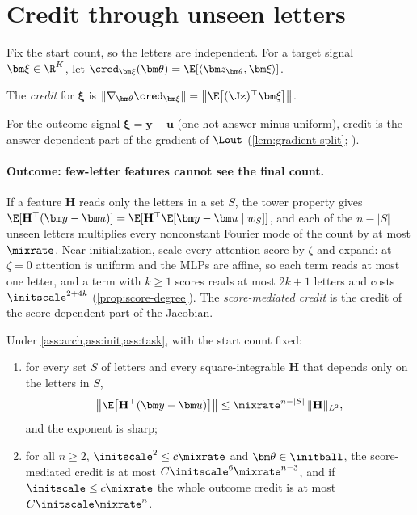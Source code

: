 \section{Credit through unseen letters}
\label{sec:credit}

Fix the start count, so the letters are independent. For a target signal $\bm\xi\in\R^K$, let $\cred_{\bm\xi}(\bm\theta)=\E[\langle\bm z_{\bm\theta},\bm\xi\rangle]$.

\begin{definition}[Credit]
\label{def:credit}
The \emph{credit} for $\bm\xi$ is $\|\nabla_{\bm\theta}\cred_{\bm\xi}\|=\bigl\|\E\bigl[(\Jz)^\top\bm\xi\bigr]\bigr\|$.
\end{definition}
For the outcome signal $\bm\xi=\bm y-\bm u$ (one-hot answer minus uniform), credit is the answer-dependent part of the gradient of
$\Lout$ (\cref{lem:gradient-split}; \citealp{shalevshwartz2017failures,abbe2025parities}).

\paragraph{Outcome: few-letter features cannot see the final count.} If a feature $\mathbf H$ reads only the letters in a set $S$, the tower
property gives $\E[\mathbf H^\top(\bm y-\bm u)]=\E[\mathbf H^\top\E[\bm y-\bm u\mid w_S]]$, and each of the $n-|S|$ unseen letters multiplies every
nonconstant Fourier mode of the count by at most $\mixrate$. Near initialization, scale every attention score by $\zeta$ and expand: at
$\zeta=0$ attention is uniform and the MLPs are affine, so each term reads at most one letter, and a term with $k\ge1$ scores reads at most
$2k+1$ letters and costs $\initscale^{2+4k}$ (\cref{prop:score-degree}). The \emph{score-mediated credit} is the credit of the score-dependent
part of the Jacobian.

\begin{lemma}
\label{thm:main}
Under \cref{ass:arch,ass:init,ass:task}, with the start count fixed:
\begin{enumerate}[label=(\roman*),leftmargin=*,itemsep=0pt,topsep=2pt]
\item for every set $S$ of letters and every square-integrable $\mathbf H$ that depends only on the letters in $S$,
\begin{equation}
 \bigl\|\E\bigl[\mathbf H^\top(\bm y-\bm u)\bigr]\bigr\|\le\mixrate^{n-|S|}\,\|\mathbf H\|_{L^2},
 \label{eq:credit-degree}
\end{equation}
and the exponent is sharp;
\item for all $n\ge2$, $\initscale^2\le c\mixrate$ and $\bm\theta\in\initball$, the score-mediated credit is at most $C\initscale^6\mixrate^{n-3}$, and if
$\initscale\le c\mixrate$ the whole outcome credit is at most $C\initscale\mixrate^n$.
\end{enumerate}
\end{lemma}

